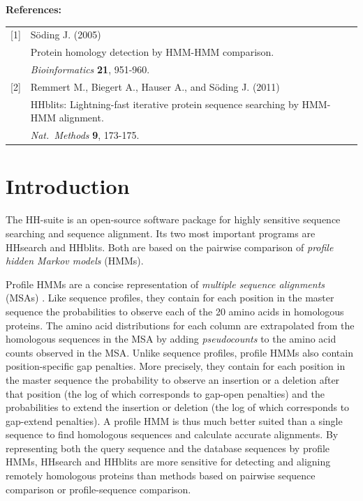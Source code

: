 \documentclass[11pt,a4paper]{article}
\begin{document}
{\bf References:}


\begin{tabular}[t]{ll}
[1] & S\"oding J. (2005)\\ 
    & Protein homology detection by HMM-HMM comparison.\\
    & {\it Bioinformatics} {\bf 21}, 951-960.\\[2mm]

[2] & Remmert M., Biegert A., Hauser A., and S\"oding J. (2011) \\
    & HHblits: Lightning-fast iterative protein sequence searching by HMM-HMM alignment. \\
    & {\it Nat.\  Methods} {\bf 9}, 173-175.\\
\end{tabular}



\newpage

\setlength{\parskip}{0mm}
\tableofcontents
\setlength{\parskip}{2mm}

\newpage

\section{Introduction}
The HH-suite is an open-source software package for highly sensitive sequence searching and sequence alignment. Its two most important programs are HHsearch and HHblits. Both are based on the pairwise comparison of \textit{profile hidden Markov models} (HMMs). 

Profile HMMs are a concise representation of \textit{multiple sequence alignments} (MSAs) \cite{Durbin:2008,Krogh:1994}. Like sequence profiles, they contain for each position in the master sequence the probabilities to observe each of the 20 amino acids in homologous proteins. The amino acid distributions for each column are extrapolated from the homologous sequences in the MSA by adding \textit{pseudocounts} to the amino acid counts observed in the MSA. Unlike sequence profiles, profile HMMs also contain position-specific gap penalties. More precisely, they contain for each position in the master sequence the probability to observe an insertion or a deletion after that position (the log of which corresponds to gap-open penalties) and the probabilities to extend the insertion or deletion (the log of which corresponds to gap-extend penalties). A profile HMM is thus much better suited than a single sequence to find homologous sequences and calculate accurate alignments. By representing both the query sequence and the database sequences by profile HMMs, HHsearch and HHblits are more sensitive for detecting and aligning remotely homologous proteins than methods based on pairwise sequence comparison or profile-sequence comparison.
\end{document}
